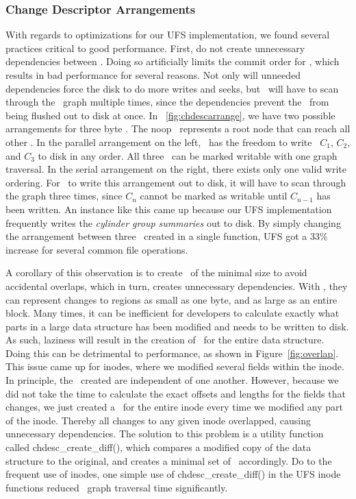 \subsubsection {Change Descriptor Arrangements}
With regards to optimizations for our UFS implementation, we found several
practices critical to good performance. First, do not create unnecessary
dependencies between \chdescs. Doing so artificially limits the commit order
for \chdescs, which results in bad performance for several reasons. Not only
will unneeded dependencies force the disk to do more writes and seeks, but
\Kudos\ will have to scan through the \chdesc\ graph multiple times, since the
dependencies prevent the \chdescs\ from being flushed out to disk at once.
In ~\ref{fig:chdescarrange}, we have two possible arrangements for three
byte \chdescs. The noop \chdesc\ represents a root node that can reach all
other \chdescs. In the parallel arrangement on the left, \Kudos\ has the
freedom to write \chdescs\ $C_1$, $C_2$, and $C_3$ to disk in any order. All
three \chdescs\ can be marked writable with one graph traversal. In the serial
arrangement on the right, there exists only one valid write ordering. For
\Kudos\ to write this arrangement out to disk, it will have to scan through
the graph three times, since \chdesc $C_n$ cannot be marked as writable until
$C_{n-1}$ has been written.
An instance like this came up because our UFS implementation frequently writes
the \emph{cylinder group summaries} out to disk. By simply changing the
arrangement between three \chdescs\ created in a single function, UFS got a
33\% increase for several common file operations.

A corollary of this observation is to create \chdescs\ of the minimal size
to avoid accidental overlaps, which in turn, creates unnecessary dependencies.
With \chdescs, they can represent changes to regions as small as one byte, and
as large as an entire block. Many times, it can be inefficient for developers
to calculate exactly what parts in a large data structure has been modified and
needs to be written to disk. As such, laziness will result in the creation of
\chdescs\ for the entire data structure. Doing this can be detrimental to
performance, as shown in Figure~\ref{fig:overlap}. This issue came up for
inodes, where we modified several fields within the inode. In principle, the
\chdescs\ created are independent of one another. However, because we did not
take the time to calculate the exact offsets and lengths for the fields that
changes, we just created a \chdesc\ for the entire inode every time we modified
any part of the inode. Thereby all changes to any given inode overlapped,
causing unnecessary dependencies. The solution to this problem is a utility
function called chdesc\_create\_diff(), which compares a modified copy of the
data structure to the original, and creates a minimal set of \chdescs\ 
accordingly. Do to the frequent use of inodes, one simple use of
chdesc\_create\_diff() in the UFS inode functions reduced \chdescs\ graph
traversal time significantly.

